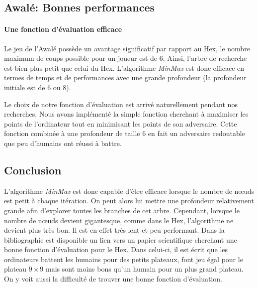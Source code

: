 


\subsection{Awalé: Bonnes performances}
\paragraph{Une fonction d'évaluation efficace} 
Le jeu de l'Awalé possède un avantage significatif par rapport au Hex, le nombre maximum de coups
possible pour un joueur est de 6. Ainsi, l'arbre de recherche est bien plus petit que celui du Hex. L'algorithme \emph{MinMax} est donc efficace en termes de
temps et de performances avec une grande profondeur (la profondeur initiale est de 6 ou 8).

Le choix de notre fonction d'évaluation est arrivé naturellement pendant nos recherches. Nous avons implémenté la simple fonction cherchant à
maximiser les points de l'ordinateur tout en minimisant les points de son adversaire. Cette fonction combinée à une profondeur de taille 6 en fait un
adversaire redoutable que peu d'humains ont réussi à battre.

\subsection{Conclusion}
L'algorithme \emph{MinMax} est donc capable d'être efficace lorsque le nombre de nœuds est petit à chaque itération. On peut alors
lui mettre une profondeur relativement grande afin d'explorer toutes les branches de cet arbre.
Cependant, lorsque le nombre de nœuds devient gigantesque, comme dans le Hex, l'algorithme ne devient plus très bon. Il est en effet très lent et peu performant.
Dans la bibliographie est disponible un lien vers un papier scientifique cherchant une bonne fonction d'évaluation pour le Hex.
Dans celui-ci, il est écrit que les ordinateurs battent les humains pour des petits plateaux, font jeu égal pour le plateau $9\times9$ mais
sont moins bons qu'un humain pour un plus grand plateau. On y voit aussi la difficulté de trouver une bonne fonction d'évaluation.
